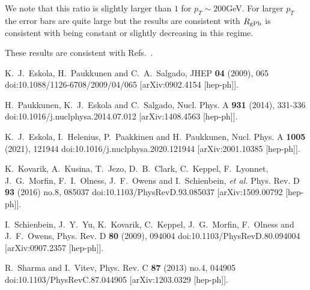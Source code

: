\documentclass[aps,prd,%
 ]{revtex4}
\begin{document}
We note that this ratio is slightly larger than $1$ for $p_T\sim 200$GeV. For
larger $p_T$ the error bars are quite large but the results are consistent with
$R_{\rm{gPb}}$ is consistent with being constant or slightly decreasing in this 
regime. 

These results are consistent with
Refs.~\cite{Chatrchyan:2014hqa,Epple:2017qtk}. 
\begin{thebibliography}{9}
K.~J.~Eskola, H.~Paukkunen and C.~A.~Salgado,
JHEP \textbf{04} (2009), 065
doi:10.1088/1126-6708/2009/04/065
[arXiv:0902.4154 [hep-ph]].

H.~Paukkunen, K.~J.~Eskola and C.~Salgado,
Nucl. Phys. A \textbf{931} (2014), 331-336
doi:10.1016/j.nuclphysa.2014.07.012
[arXiv:1408.4563 [hep-ph]].

K.~J.~Eskola, I.~Helenius, P.~Paakkinen and H.~Paukkunen,
Nucl. Phys. A \textbf{1005} (2021), 121944
doi:10.1016/j.nuclphysa.2020.121944
[arXiv:2001.10385 [hep-ph]].

K.~Kovarik, A.~Kusina, T.~Jezo, D.~B.~Clark, C.~Keppel, F.~Lyonnet, J.~G.~Morfin, F.~I.~Olness, J.~F.~Owens and I.~Schienbein, \textit{et al.}
Phys. Rev. D \textbf{93} (2016) no.8, 085037
doi:10.1103/PhysRevD.93.085037
[arXiv:1509.00792 [hep-ph]].

I.~Schienbein, J.~Y.~Yu, K.~Kovarik, C.~Keppel, J.~G.~Morfin, F.~Olness and J.~F.~Owens,
Phys. Rev. D \textbf{80} (2009), 094004
doi:10.1103/PhysRevD.80.094004
[arXiv:0907.2357 [hep-ph]].

R.~Sharma and I.~Vitev,
Phys. Rev. C \textbf{87} (2013) no.4, 044905
doi:10.1103/PhysRevC.87.044905
[arXiv:1203.0329 [hep-ph]].


\end{thebibliography}
\end{document}

